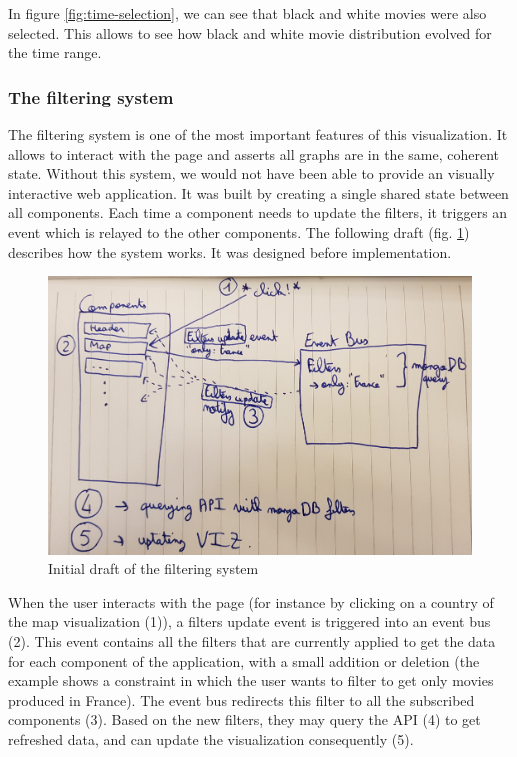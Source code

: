 \documentclass[a4paper,10pt]{article}
\begin{document}
In figure \ref{fig:time-selection}, we can see that black and white movies were
also selected. This allows to see how black and white movie distribution evolved
for the time range.

\subsubsection{The filtering system} \label{sec:filtering-system}

The filtering system is one of the most important features of this visualization.
It allows to interact with the page and asserts all graphs are in the same, coherent
state. Without this system, we would not have been able to provide an visually interactive web application.
It was built by creating a single shared state between all components. Each
time a component needs to update the filters, it triggers an event which is relayed
to the other components. The following draft (fig. \ref{fig:draft-filtering}) describes how the system works. It
was designed before implementation.

\begin{figure}[ht]
   \centering
   \includegraphics[width=0.6\linewidth]{images/drafts/filtering-system.jpg}
  \caption{Initial draft of the filtering system} \label{fig:draft-filtering}
\end{figure}

When the user interacts with the page (for instance by clicking on a country of the
map visualization (1)), a filters update event is triggered into an event bus (2). This
event contains all the filters that are currently applied to get the data for each
component of the application, with a small addition or deletion (the example shows
a constraint in which the user wants to filter to get only movies produced in France).
The event bus redirects this filter to all the subscribed components (3). Based on
the new filters, they may query the API (4) to get refreshed data, and can update
the visualization consequently (5).
\end{document}
